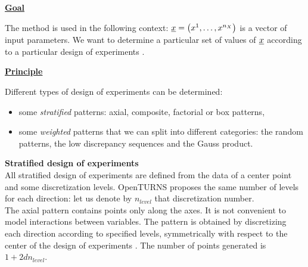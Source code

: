 \renewcommand{\etapemethodo}{C}
\renewcommand{\nomfichier}{docref_C11_ExperimentPlanes}
\renewcommand{\titrefiche}{Design of Experiments}

\Header

\MathematicalDescription
    {
      \underline{\textbf{Goal}} \vspace{2mm}

      The method is used in the following context: ${\underline{x}}= \left( x^1,\ldots,x^{n_X} \right)$ is a vector of input parameters. We want to determine a particular set of values of ${\underline{x}}$ according to a particular design of experiments .
      \vspace*{2mm}

      \underline{\textbf{Principle}}
      \vspace{2mm}

      Different types of design of experiments can be determined:
      \begin{itemize}
      \item some \emph{stratified} patterns: axial, composite, factorial or box patterns,
      \item some \emph{weighted} patterns that we can split into different categories: the random patterns, the low discrepancy sequences and the Gauss product.
      \end{itemize}

      \vspace*{2mm}

      {\bf Stratified design of experiments }\\

      All stratified design of experiments are defined from the data of a center point and some discretization levels. OpenTURNS proposes the same number of levels for each direction: let us denote by $n_{level}$ that discretization number.\\

      The axial pattern contains points only along the axes. It is not convenient to model interactions between variables. The pattern is obtained by discretizing each direction according to specified levels, symmetrically with respect to the center of the design of experiments . The number of points generated is $1 + 2dn_{level}$.\\

}
